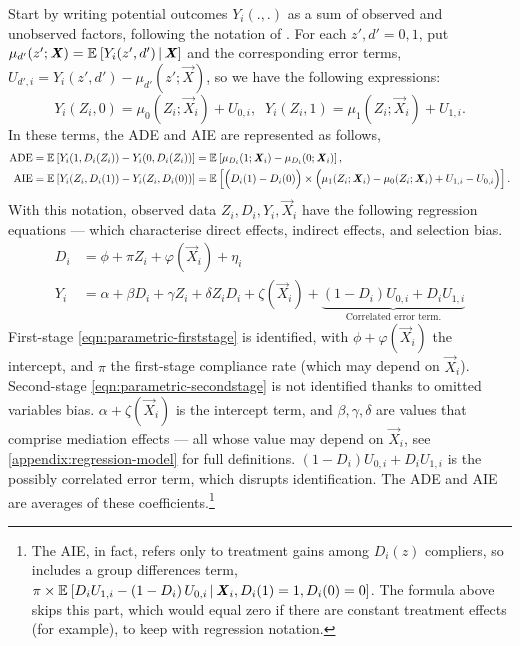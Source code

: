 Start by writing potential outcomes $Y_i(., .)$ as a sum of observed and unobserved factors, following the notation of \cite{heckman2005structural}.
For each $z',d' = 0,1$, put $\mu_{d'}(z'; \boldsymbol{\mathit{X}}) = \mathbb{E}_{} \left[ Y_i(z', d') \, \middle\vert \, \boldsymbol{\mathit{X}} \right]$ and the corresponding error terms, $U_{d', i} = Y_i(z', d') - \mu_{d'}(z'; \vec X)$, so we have the following expressions:
\[ Y_i(Z_i, 0)
        = \mu_{0}(Z_i; \vec X_i) + U_{0,i}, \;\;
    Y_i(Z_i, 1)
        = \mu_{1}(Z_i; \vec X_i) + U_{1,i}. \]
In these terms, the ADE and AIE are represented as follows,
\begin{align*}
    \text{ADE}
    = \mathbb{E}_{} \left[ Y_i(1, D_i(Z_i)) - Y_i(0, D_i(Z_i)) \right]
    &= \mathbb{E}_{} \left[  \mu_{D_i}(1; \boldsymbol{\mathit{X}}_i) - \mu_{D_i}(0; \boldsymbol{\mathit{X}}_i) \right], \\
    \text{AIE}
    = \mathbb{E}_{} \left[ Y_i(Z_i, D_i(1)) - Y_i(Z_i, D_i(0)) \right]
        &= \mathbb{E}_{} \left[ \Big( D_i(1) - D_i(0) \Big)
        \times \Big( \mu_1(Z_i; \boldsymbol{\mathit{X}}_i) - \mu_0(Z_i; \boldsymbol{\mathit{X}}_i) + U_{1,i} - U_{0,i}\Big)  \right].
\end{align*}
With this notation, observed data $Z_i, D_i, Y_i, \vec X_i$ have the following regression equations --- which characterise direct effects, indirect effects, and selection bias.
\begin{align}
    \label{eqn:parametric-firststage}
    D_i &= \phi + \pi Z_i + \varphi(\vec X_i) + \eta_i  \\
    \label{eqn:parametric-secondstage}
    Y_i &= \alpha + \beta D_i + \gamma Z_i + \delta Z_i D_i
    + \zeta(\vec X_i)
    + \underbrace{\left(1 - D_i \right)U_{0,i} + D_i U_{1,i}}_{
        \text{Correlated error term.}}
\end{align}
First-stage \eqref{eqn:parametric-firststage} is identified, with $\phi + \varphi(\vec X_i)$ the intercept, and $\pi$ the first-stage compliance rate (which may depend on $\vec X_i$).
Second-stage \eqref{eqn:parametric-secondstage} is not identified thanks to omitted variables bias.
$\alpha + \zeta(\vec X_i)$ is the intercept term, and $\beta, \gamma, \delta$ are values that comprise mediation effects --- all whose value may depend on $\vec X_i$, see \autoref{appendix:regression-model} for full definitions.
$\left(1 - D_i \right)U_{0,i} + D_i U_{1,i}$ is the possibly correlated error term, which disrupts identification.
The ADE and AIE are averages of these coefficients.\footnote{
    The AIE, in fact, refers only to treatment gains among $D_i(z)$ compliers, so includes a group differences term, $\pi \times\mathbb{E}_{} \left[ 
            D_i U_{1,i} - \left(1 - D_i \right)U_{0,i}
         \, \middle\vert \, \boldsymbol{\mathit{X}}_i, D_i(1) = 1, D_i(0) = 0 \right] $.
    The formula above skips this part, which would equal zero if there are constant treatment effects (for example), to keep with regression notation.
}
